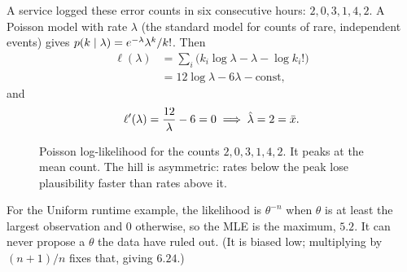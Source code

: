 A service logged these error counts in six consecutive hours: $2, 0, 3, 1, 4, 2$. A
Poisson model with rate $\lambda$ (the standard model for counts of rare, independent
events) gives $p(k\mid\lambda) = e^{-\lambda}\lambda^k/k!$. Then
\begin{align*}
  \ell(\lambda) &= \sum_i\big(k_i\log\lambda - \lambda - \log k_i!\big) \\
  &= 12\log\lambda - 6\lambda - \text{const},
\end{align*}
and
\[
  \ell'(\lambda) = \frac{12}{\lambda} - 6 = 0 \implies \hat\lambda = 2 = \bar{x} .
\]

\begin{figure}[H]
\centering
{}
\caption{Poisson log-likelihood for the counts $2,0,3,1,4,2$. It peaks at the mean
count. The hill is asymmetric: rates below the peak lose plausibility faster than rates
above it.}
\label{fig:lik-poisson}
\end{figure}

For the Uniform runtime example, the likelihood is $\theta^{-n}$ when $\theta$ is at
least the largest observation and $0$ otherwise, so the MLE is the maximum, $5.2$. It
can never propose a $\theta$ the data have ruled out. (It is biased low; multiplying by
$(n+1)/n$ fixes that, giving $6.24$.)

